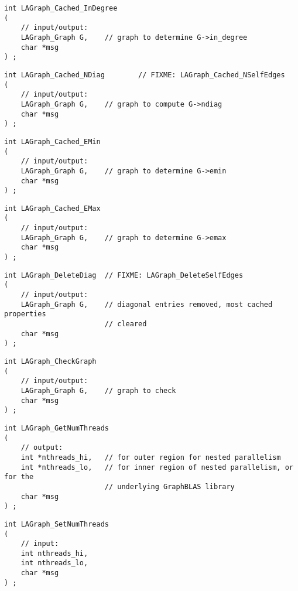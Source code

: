 \begin{verbatim}
int LAGraph_Cached_InDegree
(
    // input/output:
    LAGraph_Graph G,    // graph to determine G->in_degree
    char *msg
) ;
\end{verbatim}




\begin{verbatim}
int LAGraph_Cached_NDiag        // FIXME: LAGraph_Cached_NSelfEdges
(
    // input/output:
    LAGraph_Graph G,    // graph to compute G->ndiag
    char *msg
) ;
\end{verbatim}




\begin{verbatim}
int LAGraph_Cached_EMin
(
    // input/output:
    LAGraph_Graph G,    // graph to determine G->emin
    char *msg
) ;
\end{verbatim}




\begin{verbatim}
int LAGraph_Cached_EMax
(
    // input/output:
    LAGraph_Graph G,    // graph to determine G->emax
    char *msg
) ;
\end{verbatim}




\begin{verbatim}
int LAGraph_DeleteDiag  // FIXME: LAGraph_DeleteSelfEdges
(
    // input/output:
    LAGraph_Graph G,    // diagonal entries removed, most cached properties
                        // cleared
    char *msg
) ;
\end{verbatim}




\begin{verbatim}
int LAGraph_CheckGraph
(
    // input/output:
    LAGraph_Graph G,    // graph to check
    char *msg
) ;
\end{verbatim}




\begin{verbatim}
int LAGraph_GetNumThreads
(
    // output:
    int *nthreads_hi,   // for outer region for nested parallelism
    int *nthreads_lo,   // for inner region of nested parallelism, or for the
                        // underlying GraphBLAS library
    char *msg
) ;
\end{verbatim}




\begin{verbatim}
int LAGraph_SetNumThreads
(
    // input:
    int nthreads_hi,
    int nthreads_lo,
    char *msg
) ;
\end{verbatim}




